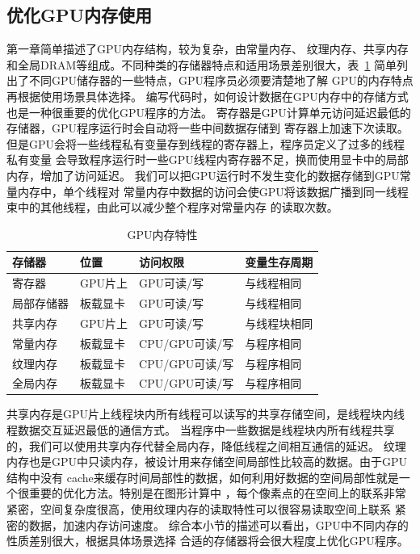 \subsection{优化GPU内存使用}
第一章简单描述了GPU内存结构，较为复杂，由常量内存、
纹理内存、共享内存和全局DRAM等组成。不同种类的存储器特点和适用场景差别很大，表~\ref{table1}
简单列出了不同GPU储存器的一些特点，GPU程序员必须要清楚地了解
GPU的内存特点再根据使用场景具体选择。
编写代码时，如何设计数据在GPU内存中的存储方式也是一种很重要的优化GPU程序的方法。
寄存器是GPU计算单元访问延迟最低的存储器，GPU程序运行时会自动将一些中间数据存储到
寄存器上加速下次读取。但是GPU会将一些线程私有变量存到线程的寄存器上，程序员定义了过多的线程私有变量
会导致程序运行时一些GPU线程内寄存器不足，换而使用显卡中的局部内存，增加了访问延迟。
我们可以把GPU运行时不发生变化的数据存储到GPU常量内存中，单个线程对
常量内存中数据的访问会使GPU将该数据广播到同一线程束中的其他线程，由此可以减少整个程序对常量内存
的读取次数。
\begin{table}[b]
  \centering
  \caption{GPU内存特性}
  \begin{tabular}{llll}
    \hline
    存储器     & 位置      & 访问权限 & 变量生存周期    \\
    \hline
    寄存器     & GPU片上   & GPU可读/写  & 与线程相同    \\
    局部存储器 & 板载显卡  & GPU可读/写  & 与线程相同    \\
    共享内存   & GPU片上   & GPU可读/写  & 与线程块相同   \\
    常量内存   & 板载显卡  & CPU/GPU可读/写  &  与程序相同     \\
    纹理内存   & 板载显卡  & CPU/GPU可读/写  &  与程序相同         \\
    全局内存   & 板载显卡  & CPU/GPU可读/写  &  与程序相同  \\

    \hline
  \end{tabular}
  \label{table1}
\end{table}
共享内存是GPU片上线程块内所有线程可以读写的共享存储空间，是线程块内线程数据交互延迟最低的通信方式。
当程序中一些数据是线程块内所有线程共享的，我们可以使用共享内存代替全局内存，降低线程之间相互通信的延迟。
纹理内存也是GPU中只读内存，被设计用来存储空间局部性比较高的数据。由于GPU结构中没有
cache来缓存时间局部性的数据，如何利用好数据的空间局部性就是一个很重要的优化方法。特别是在图形计算中
，每个像素点的在空间上的联系非常紧密，空间复杂度很高，使用纹理内存的读取特性可以很容易读取空间上联系
紧密的数据，加速内存访问速度。
综合本小节的描述可以看出，GPU中不同内存的性质差别很大，根据具体场景选择
合适的存储器将会很大程度上优化GPU程序。

